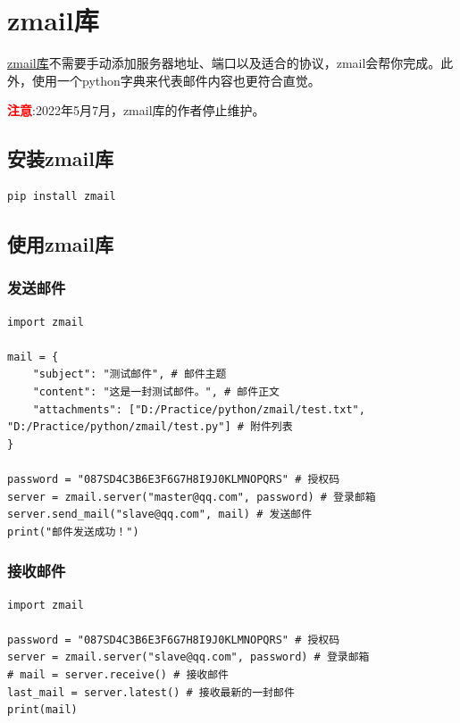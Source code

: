 \chapter{zmail库}
\href{https://github.com/zhangyunhao116/zmail}{zmail库}不需要手动添加服务器地址、端口以及适合的协议，zmail会帮你完成。此外，使用一个python字典来代表邮件内容也更符合直觉。

\textcolor{red}{\textbf{注意}}:2022年5月7月，zmail库的作者停止维护。

\section{安装zmail库}
\begin{lstlisting}[style=demostyle,numbers=none]
pip install zmail
\end{lstlisting}

\section{使用zmail库}
\subsection{发送邮件}
\begin{lstlisting}[style=demostyle,numbers=none]
import zmail

mail = {
    "subject": "测试邮件", # 邮件主题
    "content": "这是一封测试邮件。", # 邮件正文
    "attachments": ["D:/Practice/python/zmail/test.txt", "D:/Practice/python/zmail/test.py"] # 附件列表
}

password = "087SD4C3B6E3F6G7H8I9J0KLMNOPQRS" # 授权码
server = zmail.server("master@qq.com", password) # 登录邮箱
server.send_mail("slave@qq.com", mail) # 发送邮件
print("邮件发送成功！")
\end{lstlisting}

\subsection{接收邮件}
\begin{lstlisting}[style=demostyle,numbers=none]
import zmail

password = "087SD4C3B6E3F6G7H8I9J0KLMNOPQRS" # 授权码
server = zmail.server("slave@qq.com", password) # 登录邮箱
# mail = server.receive() # 接收邮件
last_mail = server.latest() # 接收最新的一封邮件
print(mail)
\end{lstlisting}

